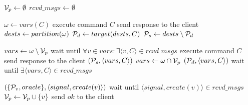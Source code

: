 \begin{algorithm}[htbp!]
\footnotesize

\begin{distribalgo}[1]


\STATE $\mathcal{V}_p \leftarrow \emptyset$
\STATE $rcvd\_msgs \leftarrow \emptyset$
\ENDINDENT

	\STATE $\omega \leftarrow vars(C)$
		\STATE execute command $C$
		\STATE send response to the client
		\STATE $dests \leftarrow partition(\omega)$
		\STATE $\mathcal{P}_d \leftarrow target(dests, C)$
		\STATE $\mathcal{P}_s \leftarrow dests \setminus \mathcal{P}_d$

			\STATE $vars \leftarrow \omega \setminus \mathcal{V}_p$
			\STATE wait until $\forall v \in vars: \exists \langle v, C \rangle \in rcvd\_msgs$
			\STATE execute command $C$
			\STATE send response to the client
			\STATE \rmcast$(\mathcal{P}_s, \langle vars, C\rangle)$
			\STATE $vars \leftarrow \omega \cap \mathcal{V}_p$
			\STATE \rmcast$(\mathcal{P}_d, \langle vars, C \rangle)$
			\STATE wait until $\exists \langle vars, C \rangle \in rcvd\_msgs$
		\ENDIF
	\ENDIF
\ENDINDENT

\vspace{1.0mm}

\vspace{1.0mm}
	\STATE \rmcast$(\{\mathcal{P}_v, oracle\}, \langle signal, create(v) \rangle)$
	\STATE wait until $\langle signal, create(v) \rangle \in rcvd\_msgs$
	\STATE $\mathcal{V}_p \leftarrow \mathcal{V}_p \cup \{v\}$
	\STATE send $ok$ to the client
\ENDINDENT


\end{distribalgo}
\end{algorithm}
